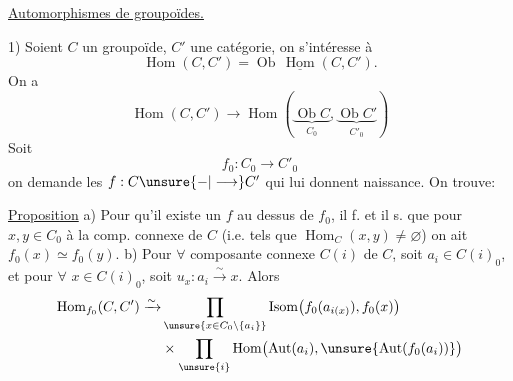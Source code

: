 \uline{Automorphismes de groupoïdes.}

1) Soient $C$  un groupoïde,
$C'$ une catégorie, on s'intéresse
à
\[
\operatorname{Hom}(C,C')=\operatorname{Ob}\,\underline{\operatorname{Hom}}(C,C').
\]
On a
\[
\operatorname{Hom}(C,C')\longrightarrow
\operatorname{Hom}(\underbrace{\operatorname{Ob}C}_{C_0},\underbrace{\operatorname{Ob}C'}_{C'_0})
\]
Soit
\[
f_0:C_0\longrightarrow C'_0
\]
on demande les $f:C\unsure{-|\longrightarrow}C'$ qui
lui donnent naissance. On trouve:

\uline{Proposition} a) Pour qu'il existe un
$f$ au dessus de $f_0$, il f. et il s.
que pour $x,y\in C_0$  à
la  comp. connexe de $C$
(i.e. tels que $\operatorname{Hom}_C(x,y)\ne\varnothing$) on ait
$f_0(x)\simeq f_0(y)$.
b) Pour $\forall$ composante
connexe $C(i)$ de $C$, soit $a_i\in C(i)_0$,
et pour $\forall$ $x\in C(i)_0$, soit
$u_x:a_i\xrightarrow{\sim}x$. Alors
\[
\begin{aligned}
\operatorname{Hom}_{f_0}(C,C')\xrightarrow{\sim}
&\prod_{\unsure{x\in C_0\setminus\{a_i\}}}
\operatorname{Isom}\bigl(f_0(a_{i(x)}),f_0(x)\bigr)\\
&\times\prod_{\unsure{i}}\operatorname{Hom}\bigl(\operatorname{Aut}(a_i),\unsure{\operatorname{Aut}(f_0(a_i))}\bigr)
\end{aligned}
\]
